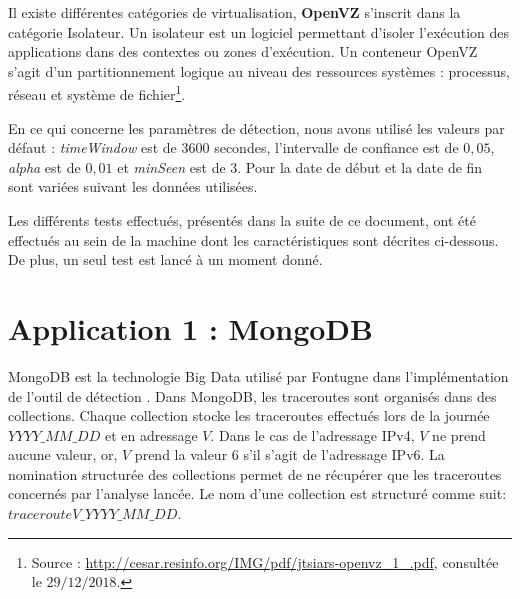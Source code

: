 \begin{tcolorbox}
	
	Il existe différentes catégories de virtualisation, \textbf{OpenVZ} s'inscrit dans la catégorie Isolateur. Un isolateur est un logiciel permettant d'isoler l'exécution des applications dans des contextes ou zones d'exécution. Un conteneur OpenVZ s'agit d'un partitionnement logique au niveau des ressources systèmes : processus, réseau et système de fichier\footnote{Source : \url{http://cesar.resinfo.org/IMG/pdf/jtsiars-openvz_1_.pdf}, consultée le $29/12/2018$.}.
\end{tcolorbox}


En ce qui concerne les paramètres de détection, nous avons utilisé les valeurs par défaut : \textit{timeWindow} est de $ 3600 $ secondes, l'intervalle de confiance est de $0,05$, \textit{alpha} est de $ 0,01 $ et \textit{minSeen} est de $3$. Pour la date de début et la date de fin sont variées suivant les données utilisées.

Les différents tests effectués, présentés dans la suite de ce document, ont été effectués  au sein de la machine dont les caractéristiques sont décrites ci-dessous. De plus, un seul test est lancé à un moment donné.

\section{Application 1 : MongoDB} \label{mongodb-impleme}

MongoDB est la technologie Big Data utilisé par  Fontugne  dans l'implémentation de l'outil de détection \cite{InternetHealthReport}. Dans MongoDB, les traceroutes sont organisés  dans des collections.  Chaque collection stocke les traceroutes effectués lors de la journée $YYYY\_MM\_DD$ et en adressage $V$. Dans le  cas de l'adressage IPv4, $V$  ne prend aucune valeur,  or, $V$ prend la valeur $6$ s'il s'agit de l'adressage IPv6.  La nomination structurée des collections permet de ne récupérer que les traceroutes concernés par l'analyse lancée. Le nom d'une collection est structuré comme suit: 	$tracerouteV\_YYYY\_MM\_DD$.
 

